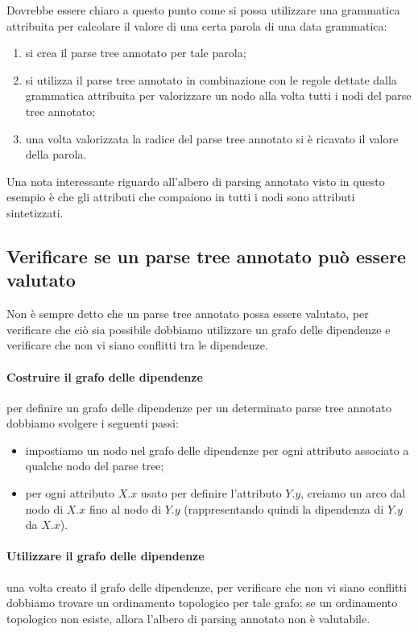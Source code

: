 \documentclass[class=book, crop=false, oneside, 12pt]{standalone}
\begin{document}
Dovrebbe essere chiaro a questo punto come si possa utilizzare una grammatica attribuita per calcolare il valore di una certa parola di una data grammatica:
\begin{enumerate}
    \item si crea il parse tree annotato per tale parola;
    \item si utilizza il parse tree annotato in combinazione con le regole dettate dalla grammatica attribuita per valorizzare un nodo alla volta tutti i nodi del parse tree annotato;
    \item una volta valorizzata la radice del parse tree annotato si è ricavato il valore della parola.
\end{enumerate}
Una nota interessante riguardo all'albero di parsing annotato visto in questo esempio è che gli attributi che compaiono in tutti i nodi sono attributi sintetizzati.

\subsection{Verificare se un parse tree annotato può essere valutato}
Non è sempre detto che un parse tree annotato possa essere valutato, per verificare che ciò sia possibile dobbiamo utilizzare un grafo delle dipendenze e verificare che non vi siano conflitti tra le dipendenze.

\paragraph*{Costruire il grafo delle dipendenze} per definire un grafo delle dipendenze per un determinato parse tree annotato dobbiamo svolgere i seguenti passi:

\begin{itemize}
    \item impostiamo un nodo nel grafo delle dipendenze per ogni attributo associato a qualche nodo del parse tree;
    \item per ogni attributo \(X.x\) usato per definire l'attributo \(Y.y\), creiamo un arco dal nodo di \(X.x\) fino al nodo di \(Y.y\) (rappresentando quindi la dipendenza di \(Y.y\) da \(X.x\)).
\end{itemize}

\paragraph*{Utilizzare il grafo delle dipendenze} una volta creato il grafo delle dipendenze, per verificare che non vi siano conflitti dobbiamo trovare un ordinamento topologico per tale grafo; se un ordinamento topologico non esiste, allora l'albero di parsing annotato non è valutabile.
\end{document}

